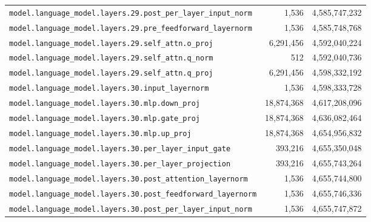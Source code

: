 \documentclass[10pt,a4paper]{article}
\theoremstyle{definition}
\begin{document}
\begin{appendices}
\begin{longtable}{p{9.5cm}rr}
\texttt{model.\allowbreak{}language\_model.\allowbreak{}layers.\allowbreak{}29.\allowbreak{}post\_per\_layer\_input\_norm} & 1,536 & 4,585,747,232 \\
\texttt{model.\allowbreak{}language\_model.\allowbreak{}layers.\allowbreak{}29.\allowbreak{}pre\_feedforward\_layernorm} & 1,536 & 4,585,748,768 \\
\texttt{model.\allowbreak{}language\_model.\allowbreak{}layers.\allowbreak{}29.\allowbreak{}self\_attn.\allowbreak{}o\_proj} & 6,291,456 & 4,592,040,224 \\
\texttt{model.\allowbreak{}language\_model.\allowbreak{}layers.\allowbreak{}29.\allowbreak{}self\_attn.\allowbreak{}q\_norm} & 512 & 4,592,040,736 \\
\texttt{model.\allowbreak{}language\_model.\allowbreak{}layers.\allowbreak{}29.\allowbreak{}self\_attn.\allowbreak{}q\_proj} & 6,291,456 & 4,598,332,192 \\
\texttt{model.\allowbreak{}language\_model.\allowbreak{}layers.\allowbreak{}30.\allowbreak{}input\_layernorm} & 1,536 & 4,598,333,728 \\
\texttt{model.\allowbreak{}language\_model.\allowbreak{}layers.\allowbreak{}30.\allowbreak{}mlp.\allowbreak{}down\_proj} & 18,874,368 & 4,617,208,096 \\
\texttt{model.\allowbreak{}language\_model.\allowbreak{}layers.\allowbreak{}30.\allowbreak{}mlp.\allowbreak{}gate\_proj} & 18,874,368 & 4,636,082,464 \\
\texttt{model.\allowbreak{}language\_model.\allowbreak{}layers.\allowbreak{}30.\allowbreak{}mlp.\allowbreak{}up\_proj} & 18,874,368 & 4,654,956,832 \\
\texttt{model.\allowbreak{}language\_model.\allowbreak{}layers.\allowbreak{}30.\allowbreak{}per\_layer\_input\_gate} & 393,216 & 4,655,350,048 \\
\texttt{model.\allowbreak{}language\_model.\allowbreak{}layers.\allowbreak{}30.\allowbreak{}per\_layer\_projection} & 393,216 & 4,655,743,264 \\
\texttt{model.\allowbreak{}language\_model.\allowbreak{}layers.\allowbreak{}30.\allowbreak{}post\_attention\_layernorm} & 1,536 & 4,655,744,800 \\
\texttt{model.\allowbreak{}language\_model.\allowbreak{}layers.\allowbreak{}30.\allowbreak{}post\_feedforward\_layernorm} & 1,536 & 4,655,746,336 \\
\texttt{model.\allowbreak{}language\_model.\allowbreak{}layers.\allowbreak{}30.\allowbreak{}post\_per\_layer\_input\_norm} & 1,536 & 4,655,747,872 \\

\end{longtable}
\end{appendices}
\end{document}
